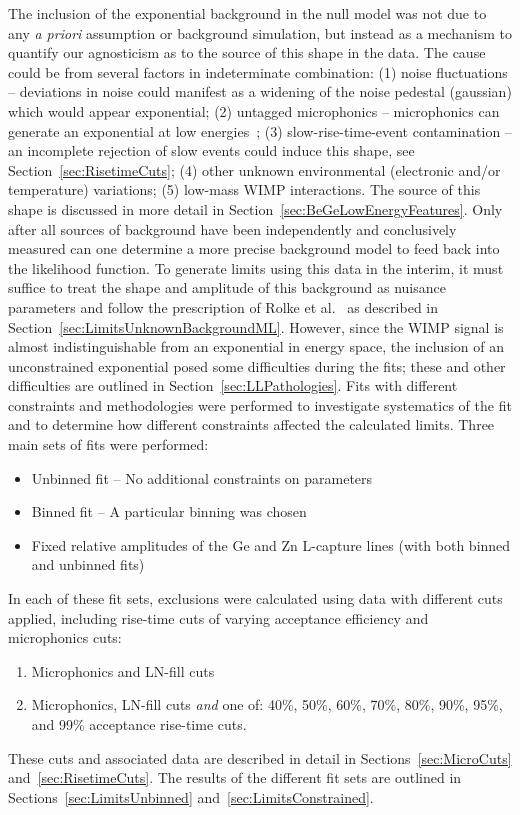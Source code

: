 The inclusion of the exponential background in the null model was not due to any \emph{a priori} assumption or background simulation, but instead as a mechanism to quantify our agnosticism as to the source of this shape in the data.  The cause could be from several factors in indeterminate combination: (1) noise fluctuations -- deviations in noise could manifest as a widening of the noise pedestal (gaussian) which would appear exponential; (2) untagged microphonics -- microphonics can generate an exponential at low energies~\cite{Morales1992410}; (3) slow-rise-time-event contamination -- an incomplete rejection of slow events could induce this shape, see Section~\ref{sec:RisetimeCuts}; (4) other unknown environmental (electronic and/or temperature) variations; (5) low-mass WIMP interactions.  The source of this shape is discussed in more detail in Section~\ref{sec:BeGeLowEnergyFeatures}.  Only after all sources of background have been independently and conclusively measured can one determine a more precise background model to feed back into the likelihood function.  To generate limits using this data in the interim, it must suffice to treat the shape and amplitude of this background as nuisance parameters and follow the prescription of Rolke et al.~\cite{Rol05} as described in Section~\ref{sec:LimitsUnknownBackgroundML}.  However, since the WIMP signal is almost indistinguishable from an exponential in energy space, the inclusion of an unconstrained exponential posed some difficulties during the fits; these and other difficulties are outlined in Section~\ref{sec:LLPathologies}.
Fits with different constraints and methodologies were performed to investigate systematics of the fit and to determine how different constraints affected the calculated limits.  Three main sets of fits were performed:
		\begin{itemize}
			\item Unbinned fit -- No additional constraints on parameters
			\item Binned fit -- A particular binning was chosen
			\item Fixed relative amplitudes of the Ge and Zn L-capture lines (with both binned and unbinned fits)
		\end{itemize}			
In each of these fit sets, exclusions were calculated using data with different cuts applied, including rise-time cuts of varying acceptance efficiency and microphonics cuts:
	\begin{enumerate}	
		\item Microphonics and LN-fill cuts
		\item Microphonics, LN-fill cuts \emph{and} one of: 40\%, 50\%, 60\%, 70\%, 80\%, 90\%, 95\%, and 99\%
		acceptance rise-time cuts.
	\end{enumerate}
These cuts and associated data are described in detail in Sections~\ref{sec:MicroCuts} and~\ref{sec:RisetimeCuts}.  The results of the different fit sets are outlined in Sections~\ref{sec:LimitsUnbinned} and~\ref{sec:LimitsConstrained}.  

